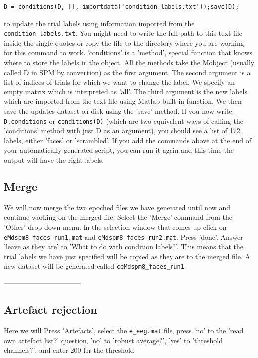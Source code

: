 \begin{verbatim}
D = conditions(D, [], importdata('condition_labels.txt'));save(D);
\end{verbatim}
to update the trial labels using information imported from the \texttt{condition_labels.txt}. You might need to write the full path to this text file inside the single quotes or copy the file to the directory where you are working for this command to work. 'conditions' is a 'method', special function that knows where to store the labels in the object. All the methods take the M\EEG object (usually called D in SPM by convention) as the first argument. The second argument is a list of indices of trials for which we want to change the label. We specify an empty matrix which is interpreted as 'all'. The third argument is the new labels which are imported from the text file using Matlab built-in function. We then save the updates dataset on disk using the 'save' method. If you now write \verb!D.conditions! or \verb!conditions(D)! (which are two equivalent ways of calling the 'conditions' method with just D as an argument), you should see a list of 172 labels, either 'faces' or 'scrambled'. If you add the commands above at the end of your automatically generated script, you can run it again and this time the output will have the right labels. 

\subsection{Merge}
We will now merge the two epoched files we have generated until now and continue working on the merged file. Select the 'Merge' command from the 'Other' drop-down menu. In the selection window that comes up click on \texttt{eMdspm8\_faces_run1.mat} and \texttt{eMdspm8\_faces_run2.mat}. Press 'done'. Answer 'leave as they are' to 'What to do with condition labels?'. This means that the trial labels we have just specified will be copied as they are to the merged file. A new dataset will be generated called \texttt{ceMdspm8\_faces_run1}.

---------------------------------


\subsection{Artefact rejection}
Here we will  Press 'Artefacts', select the \verb!e_eeg.mat! file, press 'no' to the 'read own artefact list?' question, 'no' to 'robust average?', 'yes' to 'threshold channels?', and enter 200 for the threshold

